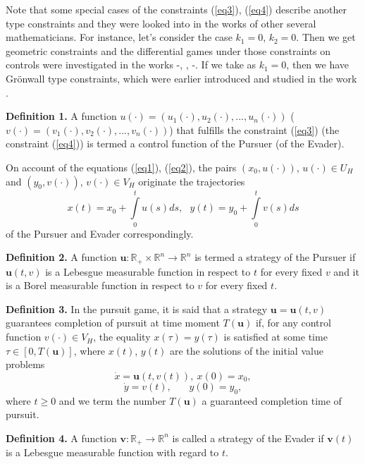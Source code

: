 \documentclass[10 pt]{book}
\begin{document}
Note that some special cases of the constraints (\ref{eq3}), (\ref{eq4}) describe another
 type constraints and they were looked into in the works of other several mathematicians.
  For instance, let's consider the case $k_{1}=0$, $k_{2}=0$. Then we get geometric constraints
   and the differential games under those constraints on controls were investigated in the works \cite{1}-\cite{11}, \cite{14}, \cite{17}-\cite{19}.
    If we take as $k_{1}=0$, then we have Gr\"{o}nwall type constraints, which were earlier introduced and studied in the work \cite{24}.

\textbf{Definition 1.}
A function $u(\cdot) = (u_1(\cdot), u_2(\cdot), ...,
u_n(\cdot))$ ($v(\cdot) = (v_1(\cdot), v_2(\cdot), ...,
v_n(\cdot))$) that fulfills the constraint (\ref{eq3})
(the constraint (\ref{eq4})) is termed a control function of the Pursuer (of the Evader).

On account of the equations (\ref{eq1}), (\ref{eq2}), the pairs $(x_0, u(\cdot))$, $u(\cdot)\in U_{H}$  and $(y_0, v(\cdot))$,
$v(\cdot)\in V_{H}$ originate the trajectories
\[
x(t)=x_0+\int\limits_0^tu(s)ds, \ \ \
y(t)=y_0+\int\limits_0^tv(s)ds
\]
of the Pursuer and Evader correspondingly.

\textbf{Definition 2.}
A function $\mathbf u: \mathbb{R}_+\times \mathbb{R}^n   \to  \mathbb{R}^n
$  is termed a strategy of the Pursuer if $\mathbf u (t,v)$ is a Lebesgue measurable function in respect
 to $t$ for every fixed $v$ and it is a Borel measurable function in respect to $v$ for every fixed $t$.

\textbf{Definition 3.}
In the pursuit game, it is said that a strategy $\mathbf u=\mathbf u(t, v)$
guarantees completion of pursuit at time moment $T(\mathbf u)$ if, for any control function $v(\cdot)\in V_{H}$, the equality $x(\tau) = y(\tau)$ is satisfied at some time $\tau \in [0, T(\mathbf u)]$, where $x(t)$, $y(t)$ are the solutions of the initial value problems
\begin{equation}\label{eq5}
\dot{x}= \mathbf u(t, v(t)), \  x(0)=x_0,
\end{equation}
\begin{equation}\label{eq6}
\dot{y}=v(t), \ \ \ \ \ \ \ \ y(0)=y_0,
\end{equation}
where $t\geq0$ and we term the number $T(\mathbf u)$ a guaranteed completion time of pursuit.

\textbf{Definition 4.}
A function $\mathbf v: \mathbb{R}_+   \to  \mathbb{R}^n$  is called a strategy of the Evader if $\mathbf v (t)$ is a
Lebesgue measurable function with regard to $t$.
\end{document}
